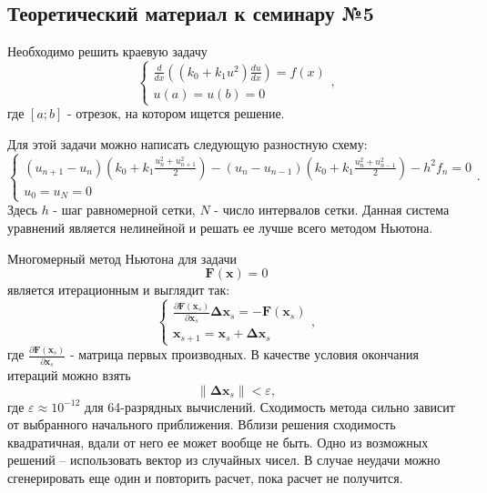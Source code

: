 \chapter{}

\section{Теоретический материал к семинару №5}

Необходимо решить краевую задачу
\begin{equation} \label{c5eq1}
	\begin{cases}
		 \displaystyle \frac{d}{dx} \left( \left( k_0 + k_1 u^2 \right) \frac{du}{dx} \right) = f(x) \\
		u(a) = u(b) = 0
	\end{cases},
\end{equation}
где $[a; b]$ - отрезок, на котором ищется решение.

Для этой задачи можно написать следующую разностную схему:
\begin{equation} \label{c5eq2}
	\begin{cases}
		\displaystyle \left( u_{n+1} - u_n \right) \left( k_0 + k_1 \frac{u_n^2 + u_{n+1}^2}{2} \right) - \left( u_n - u_{n-1} \right) \left( k_0 + k_1 \frac{u_n^2 + u_{n-1}^2}{2} \right) - h^2 f_n = 0 \\
		u_0 = u_N = 0
	\end{cases}.
\end{equation}
Здесь $h$ - шаг равномерной сетки, $N$ - число интервалов сетки. Данная система уравнений является нелинейной и решать ее лучше всего методом Ньютона.

Многомерный метод Ньютона для задачи
\begin{equation} \label{c5eq3}
	\mathbf{F}(\mathbf{x}) = 0
\end{equation}
является итерационным и выглядит так:
\begin{equation} \label{c5eq4}
	\begin{cases}
		\displaystyle \frac{\partial \mathbf{F}(\mathbf{x}_s)}{\partial \mathbf{x}_s}  \mathbf{\Delta x}_s = -\mathbf{F}(\mathbf{x}_s)\\
		\mathbf{x}_{s+1} = \mathbf{x}_s + \mathbf{\Delta x}_s
	\end{cases},
\end{equation}
где $\displaystyle \frac{\partial \mathbf{F}(\mathbf{x}_s)}{\partial \mathbf{x}_s}$ - матрица первых производных. В качестве условия окончания итераций можно взять
\begin{equation} \label{c5eq5}
	\|\mathbf{\Delta x}_s\| < \varepsilon,
\end{equation}
где $\varepsilon \approx 10^{-12}$ для 64-разрядных вычислений. Сходимость метода сильно зависит от выбранного начального приближения. Вблизи решения сходимость квадратичная, вдали от него ее может вообще не быть. Одно из возможных решений – использовать вектор из случайных чисел. В случае неудачи можно сгенерировать еще один и повторить расчет, пока расчет не получится.

